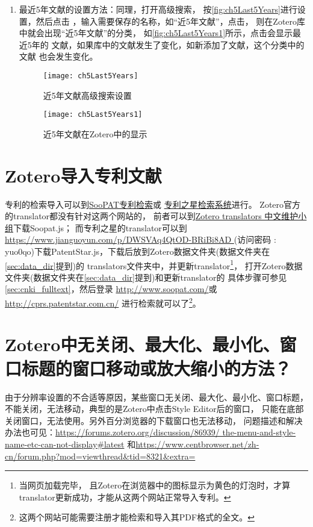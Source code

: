 \documentclass[cn,11pt,chinese]{elegantbook}
\begin{document}
\begin{enumerate}
					\item 最近5年文献的设置方法：同理，打开高级搜索，
					按\autoref{fig:ch5Last5Years}进行设置，然后点击
					，输入需要保存的名称，如“近5年文献”，点击，
					 则在Zotero库中就会出现“近5年文献”的分类，
					 如\autoref{fig:ch5Last5Years1}所示，点击会显示最近5年的
					 文献，如果库中的文献发生了变化，如新添加了文献，这个分类中的文献
					 也会发生变化。
							\begin{figure}[ht]
								\centering
								\texttt{[image: ch5Last5Years]}
								\caption{近5年文献高级搜索设置}
								\label{fig:ch5Last5Years}
							\end{figure}
						\begin{figure}[ht]
							\centering
							\texttt{[image: ch5Last5Years1]}
							\caption{近5年文献在Zotero中的显示}
							\label{fig:ch5Last5Years1}
						\end{figure}		
				\end{enumerate}


		
		\section{Zotero导入专利文献}\label{sec:Patent}
			专利的检索导入可以到\href{http://www.soopat.com/}{SooPAT专利检索}或
			\href{http://cprs.patentstar.com.cn/}{专利之星检索系统}进行。
			Zotero官方的translator都没有针对这两个网站的，
			前者可以到\href{https://github.com/l0o0/translators_CN}
			{Zotero translators 中文维护小组}下载Soopat.js；
			而专利之星的translator可以到\url{https://www.jianguoyun.com/p/DWSVAq4QtOD-BRiBi8AD
			} (访问密码 : yuo0qo)下载PatentStar.js，下载后放到Zotero数据文件夹(数据文件夹在\cref{sec:data_dir}提到)的
			translators文件夹中，并更新translator\footnote{当网页加载完毕，
			且Zotero在浏览器中的图标显示为黄色的灯泡时，才算translator更新成功，才能从这两个网站正常导入专利。}，
			打开Zotero数据文件夹(数据文件夹在\cref{sec:data_dir}提到)和更新translator的
			具体步骤可参见\cref{sec:cnki_fulltext}，然后登录
			\url{http://www.soopat.com/}或\url{http://cprs.patentstar.com.cn/}
			进行检索就可以了\footnote{这两个网站可能需要注册才能检索和导入其PDF格式的全文。}。
		
	\section{Zotero中无关闭、最大化、最小化、窗口标题的窗口移动或放大缩小的方法？}\label{sec:no_max}	
			由于分辨率设置的不合适等原因，某些窗口无关闭、最大化、最小化、窗口标题，
			不能关闭，无法移动，典型的是Zotero中点击Style Editor后的窗口，
			只能在底部关闭窗口，无法使用。另外百分浏览器的下载窗口也无法移动，
			问题描述和解决办法也可见：\url{https://forums.zotero.org/discussion/86939/
			the-menu-and-style-name-etc-can-not-display#latest}
			和\url{https://www.centbrowser.net/zh-cn/forum.php?mod=viewthread&tid=8321&extra=}
			
\end{document}
